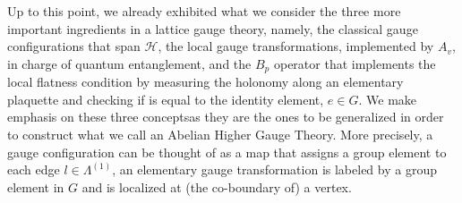 \documentclass[titlepage,11pt]{article}
\theoremstyle{plain}%
\theoremstyle{definition}
\theoremstyle{remark}
\begin{document}
Up to this point, we already exhibited what we consider the three more important ingredients in a lattice gauge theory, namely, the classical gauge configurations that span $\mathcal{H}$, the local gauge transformations, implemented by $A_v$, in charge of quantum entanglement, and the $B_p$ operator that implements the local flatness condition by measuring the holonomy along an elementary plaquette and checking if is equal to the identity element, $e \in G$. We make emphasis on these three conceptsas they are the ones to be generalized in order to construct what we call an Abelian Higher Gauge Theory. More precisely, a gauge configuration can be thought of as a map that assigns a group element to each edge $l \in \Lambda^{(1)}$, an elementary gauge transformation is labeled by a group element in $G$ and is localized at (the co-boundary of) a vertex.
\end{document}
